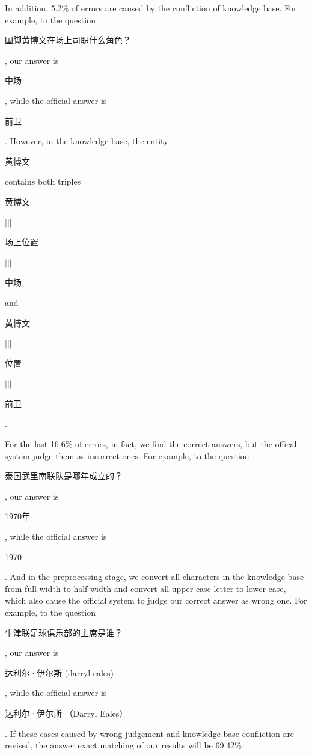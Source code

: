 \documentclass{llncs}
\begin{document}
In addition, 5.2\% of errors are caused by the confliction of knowledge base. 
For example, to the question \begin{CJK}{UTF8}{gbsn}国脚黄博文在场上司职什么角色？\end{CJK}, our answer is \begin{CJK}{UTF8}{gbsn} 
中场\end{CJK}, while the official answer is \begin{CJK}{UTF8}{gbsn} 
前卫\end{CJK}. However, in the knowledge base, the entity \begin{CJK}{UTF8}{gbsn} 
黄博文\end{CJK} contains both triples \begin{CJK}{UTF8}{gbsn} 
黄博文\end{CJK} $|||$ \begin{CJK}{UTF8}{gbsn}场上位置\end{CJK} $|||$ \begin{CJK}{UTF8}{gbsn}中场\end{CJK} and \begin{CJK}{UTF8}{gbsn} 
黄博文\end{CJK} $|||$ \begin{CJK}{UTF8}{gbsn}位置\end{CJK} $|||$ \begin{CJK}{UTF8}{gbsn}前卫\end{CJK}. 

For the last 16.6\% of errors, in fact, we 
find the correct answers, but the offical system judge them as incorrect ones. 
For example, to the question \begin{CJK}{UTF8}{gbsn}泰国武里南联队是哪年成立的？\end{CJK}, 
our answer is \begin{CJK}{UTF8}{gbsn} 
1970年\end{CJK}, while the official answer is \begin{CJK}{UTF8}{gbsn} 
1970\end{CJK}. And in the preprocessing stage, we convert all characters in the 
knowledge base from full-width to half-width and convert all upper case letter 
to lower case, which also cause the official 
system to judge our correct answer as wrong one. For example, to the question \begin{CJK}{UTF8}{gbsn}牛津联足球俱乐部的主席是谁？\end{CJK}, 
our answer is \begin{CJK}{UTF8}{gbsn} 
达利尔·伊尔斯 (darryl eales)\end{CJK}, while the official answer is \begin{CJK}{UTF8}{gbsn} 
达利尔·伊尔斯 （Darryl Eales）\end{CJK}. If these cases caused by wrong judgement and 
knowledge base confliction are revised, the answer exact matching of our results 
will be 69.42\%.
\end{document}
